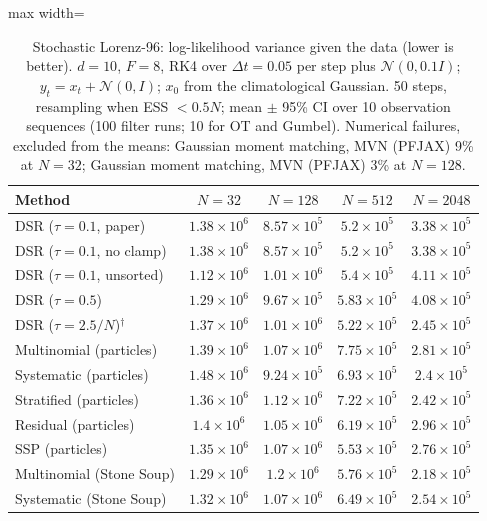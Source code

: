 \begin{table}[H]
\centering
\small
\caption{Stochastic Lorenz-96: log-likelihood variance given the data (lower is better). $d{=}10$, $F{=}8$, RK4 over $\Delta t{=}0.05$ per step plus $\mathcal N(0,0.1I)$; $y_t=x_t+\mathcal N(0,I)$; $x_0$ from the climatological Gaussian. 50 steps, resampling when ESS $<0.5N$; mean $\pm$ 95\% CI over 10 observation sequences (100 filter runs; 10 for OT and Gumbel). Numerical failures, excluded from the means: Gaussian moment matching, MVN (PFJAX) 9\% at $N{=}32$; Gaussian moment matching, MVN (PFJAX) 3\% at $N{=}128$.}
\label{tab:lorenz96-conditional_loglik_variance}
\begin{adjustbox}{max width=\linewidth}
\begin{tabular}{lcccc}
\toprule
Method & $N{=}32$ & $N{=}128$ & $N{=}512$ & $N{=}2048$ \\
\midrule
DSR ($\tau{=}0.1$, paper) & $1.38\times10^{6}$ & $8.57\times10^{5}$ & $5.2\times10^{5}$ & $3.38\times10^{5}$ \\
DSR ($\tau{=}0.1$, no clamp) & $1.38\times10^{6}$ & $8.57\times10^{5}$ & $5.2\times10^{5}$ & $3.38\times10^{5}$ \\
DSR ($\tau{=}0.1$, unsorted) & $1.12\times10^{6}$ & $1.01\times10^{6}$ & $5.4\times10^{5}$ & $4.11\times10^{5}$ \\
DSR ($\tau{=}0.5$) & $1.29\times10^{6}$ & $9.67\times10^{5}$ & $5.83\times10^{5}$ & $4.08\times10^{5}$ \\
DSR ($\tau{=}2.5/N$)$^\dagger$ & $1.37\times10^{6}$ & $1.01\times10^{6}$ & $5.22\times10^{5}$ & $2.45\times10^{5}$ \\
\midrule
Multinomial (particles) & $1.39\times10^{6}$ & $1.07\times10^{6}$ & $7.75\times10^{5}$ & $2.81\times10^{5}$ \\
Systematic (particles) & $1.48\times10^{6}$ & $9.24\times10^{5}$ & $6.93\times10^{5}$ & $2.4\times10^{5}$ \\
Stratified (particles) & $1.36\times10^{6}$ & $1.12\times10^{6}$ & $7.22\times10^{5}$ & $2.42\times10^{5}$ \\
Residual (particles) & $1.4\times10^{6}$ & $1.05\times10^{6}$ & $6.19\times10^{5}$ & $2.96\times10^{5}$ \\
SSP (particles) & $1.35\times10^{6}$ & $1.07\times10^{6}$ & $5.53\times10^{5}$ & $2.76\times10^{5}$ \\
Multinomial (Stone Soup) & $1.29\times10^{6}$ & $1.2\times10^{6}$ & $5.76\times10^{5}$ & $2.18\times10^{5}$ \\
Systematic (Stone Soup) & $1.32\times10^{6}$ & $1.07\times10^{6}$ & $6.49\times10^{5}$ & $2.54\times10^{5}$ \\

\end{tabular}
\end{adjustbox}
\end{table}
